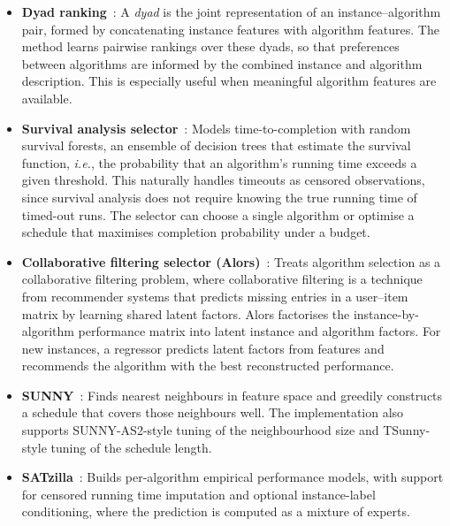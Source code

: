 \begin{itemize}
    \item \textbf{Dyad ranking}~\citep{TorEtAl19}: A \emph{dyad} is the joint representation of an instance--algorithm pair, formed by concatenating instance features with algorithm features. The method learns pairwise rankings over these dyads, so that preferences between algorithms are informed by the combined instance and algorithm description. This is especially useful when meaningful algorithm features are available.
    \item \textbf{Survival analysis selector}~\citep{TorEtAl20,MarEtAl25}: Models time-to-completion with random survival forests, an ensemble of decision trees that estimate the survival function, \emph{i.e.}, the probability that an algorithm's running time exceeds a given threshold. This naturally handles timeouts as censored observations, since survival analysis does not require knowing the true running time of timed-out runs. The selector can choose a single algorithm or optimise a schedule that maximises completion probability under a budget.
    \item \textbf{Collaborative filtering selector (Alors)}~\citep{MisEtAl17}: Treats algorithm selection as a collaborative filtering problem, where collaborative filtering is a technique from recommender systems that predicts missing entries in a user--item matrix by learning shared latent factors. Alors factorises the instance-by-algorithm performance matrix into latent instance and algorithm factors. For new instances, a regressor predicts latent factors from features and recommends the algorithm with the best reconstructed performance.
    \item \textbf{SUNNY}~\citep{AmaEtAl14,LiuEtAl21}: Finds nearest neighbours in feature space and greedily constructs a schedule that covers those neighbours well. The implementation also supports SUNNY-AS2-style tuning of the neighbourhood size and TSunny-style tuning of the schedule length.
    \item \textbf{SATzilla}~\citep{XuEtAl08}: Builds per-algorithm empirical performance models, with support for censored running time imputation and optional instance-label conditioning, where the prediction is computed as a mixture of experts.


\end{itemize}
